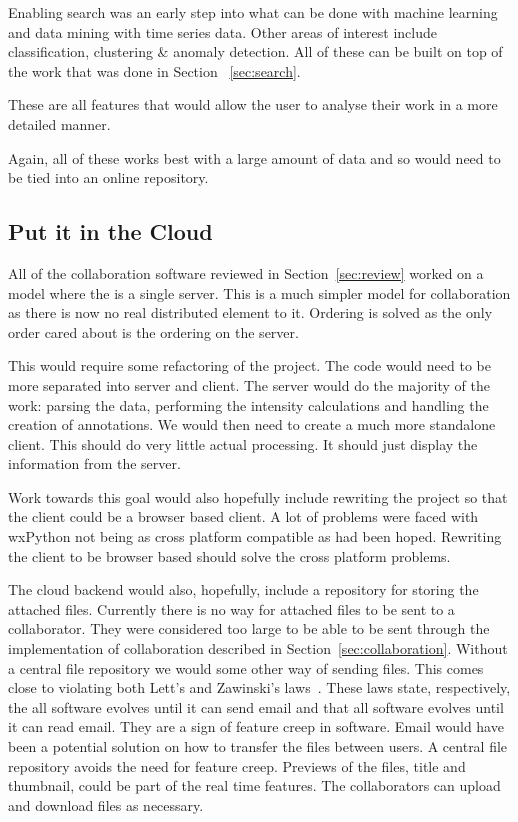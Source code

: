 Enabling search was an early step into what can be done with machine learning and data mining with time series data.  Other areas of interest include classification, clustering \& anomaly detection.  All of these can be built on top of the work that was done in Section ~\ref{sec:search}.

These are all features that would allow the user to analyse their work in a more detailed manner.

Again, all of these works best with a large amount of data and so would need to be tied into an online repository.

\subsection{Put it in the Cloud}
\label{sec:cloud}
All of the collaboration software reviewed in Section~\ref{sec:review} worked on a model where the is a single server.  This is a much simpler model for collaboration as there is now no real distributed element to it.  Ordering is solved as the only order cared about is the ordering on the server.

This would require some refactoring of the project.  The code would need to be more separated into server and client.  The server would do the majority of the work: parsing the data, performing the intensity calculations and handling the creation of annotations.  We would then need to create a much more standalone client.  This should do very little actual processing.  It should just display the information from the server.

Work towards this goal would also hopefully include rewriting the project so that the client could be a browser based client.  A lot of problems were faced with wxPython not being as cross platform compatible as had been hoped.  Rewriting the client to be browser based should solve the cross platform problems.

The cloud backend would also, hopefully, include a repository for storing the attached files.  Currently there is no way for attached files to be sent to a collaborator.  They were considered too large to be able to be sent through the implementation of collaboration described in Section~\ref{sec:collaboration}.  Without a central file repository we would some other way of sending files.  This comes close to violating both Lett's and Zawinski's laws~\cite{atwoord}.  These laws state, respectively, the all software evolves until it can send email and that all software evolves until it can read email.  They are a sign of feature creep in software.  Email would have been a potential solution on how to transfer the files between users.  A central file repository avoids the need for feature creep.  Previews of the files, title and thumbnail, could be part of the real time features.  The collaborators can upload and download files as necessary.

